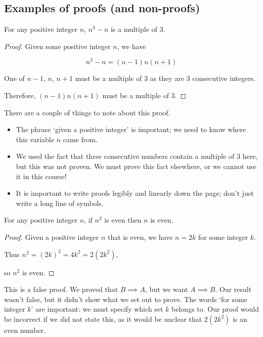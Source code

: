 \subsection{Examples of proofs (and non-proofs)}
\begin{claim}
	For any positive integer \(n\), \(n^3-n\) is a multiple of 3.
\end{claim}
\begin{proof}
	Given some positive integer \(n\), we have

	\[
		n^3 - n = (n-1)n(n+1)
	\]

	One of \(n-1,\,n,\,n+1\) must be a multiple of 3 as they are 3 consecutive integers.

	Therefore, \((n-1)n(n+1)\) must be a multiple of 3.
\end{proof}

There are a couple of things to note about this proof.
\begin{itemize}
	\item The phrase `given a positive integer' is important; we need to know where this variable \(n\) came from.
	\item We used the fact that three consecutive numbers contain a multiple of 3 here, but this was not proven.
	      We must prove this fact elsewhere, or we cannot use it in this course!
	\item It is important to write proofs legibly and linearly down the page; don't just write a long line of symbols.
\end{itemize}

\begin{claim}
	For any positive integer \(n\), if \(n^2\) is even then \(n\) is even.
\end{claim}
\begin{proof}
	Given a positive integer \(n\) that is even, we have \(n=2k\) for some integer \(k\).

	Thus \(n^2 = (2k)^2 = 4k^2 = 2(2k^2)\),

	so \(n^2\) is even.
\end{proof}
\begin{note}
	This is a false proof.
	We proved that \(B \implies A\), but we want \(A \implies B\).
	Our result wasn't false, but it didn't show what we set out to prove.
	The words `for some integer \(k\)' are important: we must specify which set \(k\) belongs to.
	Our proof would be incorrect if we did not state this, as it would be unclear that \(2(2k^2)\) is an even number.
\end{note}

